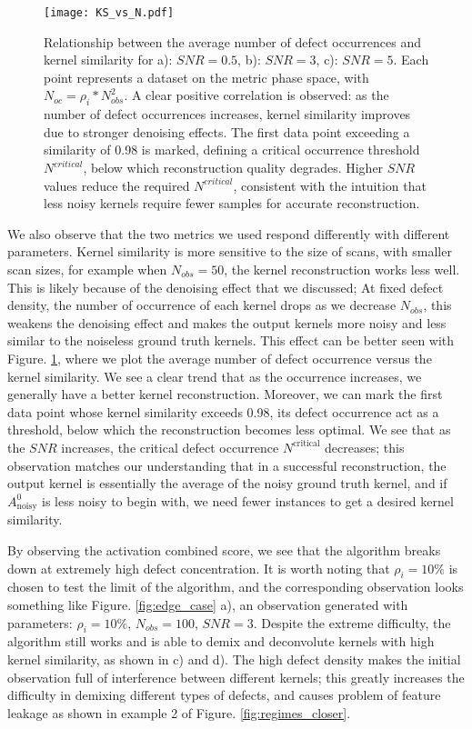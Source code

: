 \begin{figure}
	\texttt{[image: KS\_vs\_N.pdf]} 
	\centering
	\caption{Relationship between the average number of defect occurrences and kernel similarity for a): $SNR=0.5$, b): $SNR=3$, c): $SNR=5$. Each point represents a dataset on the metric phase space, with $N_{oc} = \rho_i * N_{obs}^2$. A clear positive correlation is observed: as the number of defect occurrences increases, kernel similarity improves due to stronger denoising effects. The first data point exceeding a similarity of 0.98 is marked, defining a critical occurrence threshold $N^{critical}$, below which reconstruction quality degrades. Higher $SNR$ values reduce the required $N^{critical}$, consistent with the intuition that less noisy kernels require fewer samples for accurate reconstruction.}
	\label{fig:KS_vs_N}
\end{figure}

We also observe that the two metrics we used respond differently with different parameters. Kernel similarity is more sensitive to the size of scans, with smaller scan sizes, for example when $N_{obs} = 50$, the kernel reconstruction works less well. This is likely because of the denoising effect that we discussed; At fixed defect density, the number of occurrence of each kernel drops as we decrease $N_{obs}$, this weakens the denoising effect and makes the output kernels more noisy and less similar to the noiseless ground truth kernels. This effect can be better seen with Figure. \ref{fig:KS_vs_N}, where we plot the average number of defect occurrence versus the kernel similarity. We see a clear trend that as the occurrence increases, we generally have a better kernel reconstruction. Moreover, we can mark the first data point whose kernel similarity exceeds 0.98, its defect occurrence act as a threshold, below which the reconstruction becomes less optimal. We see that as the $SNR$ increases, the critical defect occurrence $N^{\text{critical}}$ decreases; this observation matches our understanding that in a successful reconstruction, the output kernel is essentially the average of the noisy ground truth kernel, and if $A^0_{\text{noisy}}$ is less noisy to begin with, we need fewer instances to get a desired kernel similarity.   

By observing the activation combined score, we see that the algorithm breaks down at extremely high defect concentration. It is worth noting that $\rho_i = 10\%$ is chosen to test the limit of the algorithm, and the corresponding observation looks something like Figure. \ref{fig:edge_case} a), an observation generated with parameters: $\rho_i = 10\%$, $N_{obs}=100$, $SNR=3$. Despite the extreme difficulty, the algorithm still works and is able to demix and deconvolute kernels with high kernel similarity, as shown in c) and d). The high defect density makes the initial observation full of interference between different kernels; this greatly increases the difficulty in demixing different types of defects, and causes problem of feature leakage as shown in example 2 of Figure. \ref{fig:regimes_closer}.  


